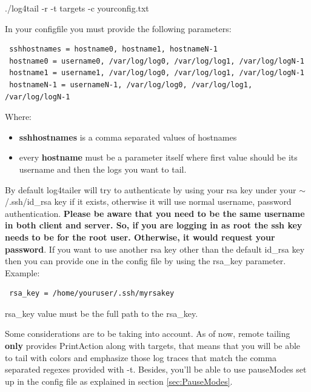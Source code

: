 \begin{cmd}
 ./log4tail -r -t targets -c yourconfig.txt
\end{cmd}
In your configfile you must provide the following parameters:

\begin{config}
\begin{verbatim}
 sshhostnames = hostname0, hostname1, hostnameN-1
 hostname0 = username0, /var/log/log0, /var/log/log1, /var/log/logN-1
 hostname1 = username1, /var/log/log0, /var/log/log1, /var/log/logN-1
 hostnameN-1 = usernameN-1, /var/log/log0, /var/log/log1, /var/log/logN-1
\end{verbatim}
\end{config}

\noindent
Where:
\begin{itemize}
\item \textbf{sshhostnames} is a comma separated values of hostnames
\item every \textbf{hostname} must be a parameter itself where first 
value should be its username and then the logs you want to tail.
\end{itemize}

By default log4tailer will try to authenticate by using your rsa key under your
$\sim$/.ssh/id\_rsa key if it exists, otherwise it will use normal username, password
authentication. \textbf{Please be aware that you need to be the same username
in both client and server. So, if you are logging in as root the ssh key needs
to be for the root user. Otherwise, it would request your password}.
If you want to use another rsa key other than the default
id\_rsa key then you can provide one in the config file by using the rsa\_key
parameter. Example:

\begin{config}
\begin{verbatim}
 rsa_key = /home/youruser/.ssh/myrsakey
\end{verbatim} 
\end{config}

\noindent
rsa\_key value must be the full path to the rsa\_key.

Some considerations are to be taking into account. As of now, remote tailing
\textbf{only} provides PrintAction along with targets, that means that you will
be able to tail with colors and emphasize those log traces that match the comma
separated regexes provided with -t. Besides, you'll be able to use pauseModes
set up in the config file as explained in section \ref{sec:PauseModes}.

